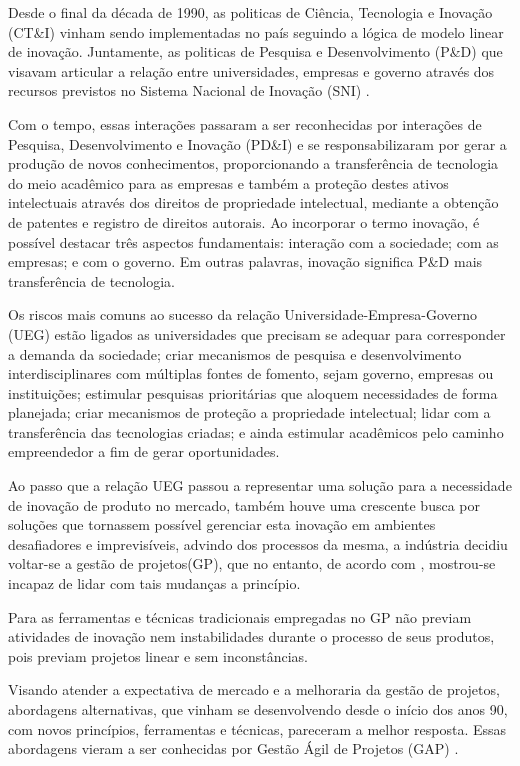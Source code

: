 Desde o final da década de 1990, as politicas de Ciência, Tecnologia e Inovação (CT\&I) vinham sendo implementadas no país seguindo a lógica de modelo linear de inovação. Juntamente, as politicas de Pesquisa e Desenvolvimento (P\&D) que visavam articular a relação entre universidades, empresas e governo através dos recursos previstos no Sistema Nacional de Inovação (SNI) \cite{kuhlmann112008logicas}.

Com o tempo, essas interações passaram a ser reconhecidas por interações de Pesquisa, Desenvolvimento e Inovação (PD\&I) e se responsabilizaram por gerar a produção de novos conhecimentos, proporcionando a transferência de tecnologia do meio acadêmico para as empresas e também a proteção destes ativos intelectuais através dos direitos de propriedade intelectual, mediante a obtenção de patentes e registro de direitos autorais. Ao incorporar o termo inovação, é possível destacar três aspectos fundamentais: interação com a sociedade; com as empresas; e com o governo. Em outras palavras, inovação significa P\&D mais transferência de tecnologia.

Os riscos mais comuns ao sucesso da relação Universidade-Empresa-Governo (UEG) estão ligados as universidades que precisam se adequar para corresponder a demanda da sociedade; criar mecanismos de pesquisa e desenvolvimento interdisciplinares com múltiplas fontes de fomento, sejam governo, empresas ou instituições; estimular pesquisas prioritárias que aloquem necessidades de forma planejada; criar mecanismos de proteção a propriedade intelectual; lidar com a transferência das tecnologias criadas; e ainda estimular acadêmicos pelo caminho empreendedor a fim de gerar oportunidades.

Ao passo que a relação UEG passou a representar uma solução para a necessidade de inovação de produto no mercado, também houve uma crescente busca por soluções que tornassem possível gerenciar esta inovação em ambientes desafiadores e imprevisíveis, advindo dos processos da mesma, a indústria decidiu voltar-se a gestão de projetos(GP), que no entanto, de acordo com , mostrou-se incapaz de lidar com tais mudanças a princípio.

Para  as ferramentas e técnicas tradicionais empregadas no GP não previam atividades de inovação nem instabilidades durante o processo de seus produtos, pois previam projetos linear e sem inconstâncias.

Visando atender a expectativa de mercado e a melhoraria da gestão de projetos, abordagens alternativas, que vinham se desenvolvendo desde o início dos anos 90, com novos princípios, ferramentas e técnicas, pareceram a melhor resposta. Essas abordagens vieram a ser conhecidas por Gestão Ágil de Projetos (GAP) \cite{amaral2011gerenciamento}.

